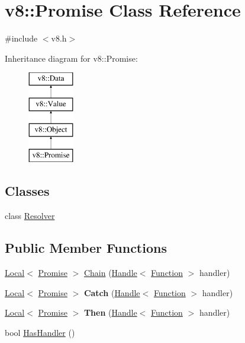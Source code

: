 \hypertarget{classv8_1_1_promise}{}\section{v8\+:\+:Promise Class Reference}
\label{classv8_1_1_promise}


{\ttfamily \#include $<$v8.\+h$>$}

Inheritance diagram for v8\+:\+:Promise\+:\begin{figure}[H]
\begin{center}
\leavevmode
\includegraphics[height=4.000000cm]{classv8_1_1_promise}
\end{center}
\end{figure}
\subsection*{Classes}
\begin{DoxyCompactItemize}
\item 
class \hyperlink{classv8_1_1_promise_1_1_resolver}{Resolver}
\end{DoxyCompactItemize}
\subsection*{Public Member Functions}
\begin{DoxyCompactItemize}
\item 
\hyperlink{classv8_1_1_local}{Local}$<$ \hyperlink{classv8_1_1_promise}{Promise} $>$ \hyperlink{classv8_1_1_promise_af56616dc11de23d6d515b0fa5d42e1eb}{Chain} (\hyperlink{classv8_1_1_handle}{Handle}$<$ \hyperlink{classv8_1_1_function}{Function} $>$ handler)
\item 
\hypertarget{classv8_1_1_promise_aab3dea5d0875e1506b9c8fc822b0e005}{}\hyperlink{classv8_1_1_local}{Local}$<$ \hyperlink{classv8_1_1_promise}{Promise} $>$ {\bfseries Catch} (\hyperlink{classv8_1_1_handle}{Handle}$<$ \hyperlink{classv8_1_1_function}{Function} $>$ handler)\label{classv8_1_1_promise_aab3dea5d0875e1506b9c8fc822b0e005}

\item 
\hypertarget{classv8_1_1_promise_a22a7ce609a7ddf0b15bf316e61b0178f}{}\hyperlink{classv8_1_1_local}{Local}$<$ \hyperlink{classv8_1_1_promise}{Promise} $>$ {\bfseries Then} (\hyperlink{classv8_1_1_handle}{Handle}$<$ \hyperlink{classv8_1_1_function}{Function} $>$ handler)\label{classv8_1_1_promise_a22a7ce609a7ddf0b15bf316e61b0178f}

\item 
bool \hyperlink{classv8_1_1_promise_aeea8bdfdbe2291632d7f0d45394c1722}{Has\+Handler} ()
\end{DoxyCompactItemize}
